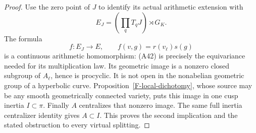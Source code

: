 \documentclass[11pt,oneside]{article}
\begin{document}
\begin{proof}
Use the zero point of $J$ to identify its actual
arithmetic extension with
\[
 E_J=\left(\prod_qT_qJ\right)\rtimes G_K.
\]
The formula
\[
 f:E_J\longrightarrow E,
       \qquad f(v,g)=r(v_\ell)s(g)                       \tag{A43}
\]
is a continuous arithmetic homomorphism: (A42)
is precisely the equivariance needed for its
multiplication law. Its geometric image is a
nonzero closed subgroup of $A_\ell$, hence is
procyclic. It is not open in the nonabelian
geometric group of a hyperbolic curve.
Proposition~\ref{F-local-dichotomy}, whose source
may be any smooth geometrically connected
variety, puts this image in one cusp inertia
$I\subset\pi$. Finally $A$ centralizes that
nonzero image. The same full inertia centralizer
identity gives $A\subset I$.
This proves the second implication and the
stated obstruction to every virtual splitting.
\end{proof}
\end{document}
